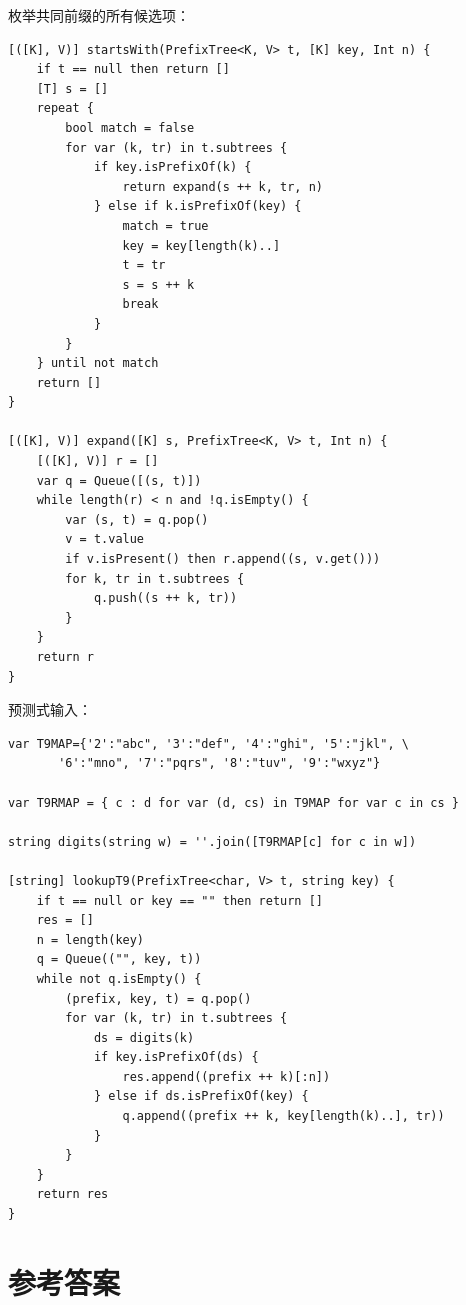 \documentclass[b5paper]{ctexart}
\begin{document}
枚举共同前缀的所有候选项：

\begin{lstlisting}[language = Bourbaki]
[([K], V)] startsWith(PrefixTree<K, V> t, [K] key, Int n) {
    if t == null then return []
    [T] s = []
    repeat {
        bool match = false
        for var (k, tr) in t.subtrees {
            if key.isPrefixOf(k) {
                return expand(s ++ k, tr, n)
            } else if k.isPrefixOf(key) {
                match = true
                key = key[length(k)..]
                t = tr
                s = s ++ k
                break
            }
        }
    } until not match
    return []
}

[([K], V)] expand([K] s, PrefixTree<K, V> t, Int n) {
    [([K], V)] r = []
    var q = Queue([(s, t)])
    while length(r) < n and !q.isEmpty() {
        var (s, t) = q.pop()
        v = t.value
        if v.isPresent() then r.append((s, v.get()))
        for k, tr in t.subtrees {
            q.push((s ++ k, tr))
        }
    }
    return r
}
\end{lstlisting}

预测式输入：
\begin{lstlisting}[language = Bourbaki]
var T9MAP={'2':"abc", '3':"def", '4':"ghi", '5':"jkl", \
       '6':"mno", '7':"pqrs", '8':"tuv", '9':"wxyz"}

var T9RMAP = { c : d for var (d, cs) in T9MAP for var c in cs }

string digits(string w) = ''.join([T9RMAP[c] for c in w])

[string] lookupT9(PrefixTree<char, V> t, string key) {
    if t == null or key == "" then return []
    res = []
    n = length(key)
    q = Queue(("", key, t))
    while not q.isEmpty() {
        (prefix, key, t) = q.pop()
        for var (k, tr) in t.subtrees {
            ds = digits(k)
            if key.isPrefixOf(ds) {
                res.append((prefix ++ k)[:n])
            } else if ds.isPrefixOf(key) {
                q.append((prefix ++ k, key[length(k)..], tr))
            }
        }
    }
    return res
}
\end{lstlisting}

\ifx\wholebook\relax\else
\section{参考答案}
\shipoutAnswer
\end{document}
